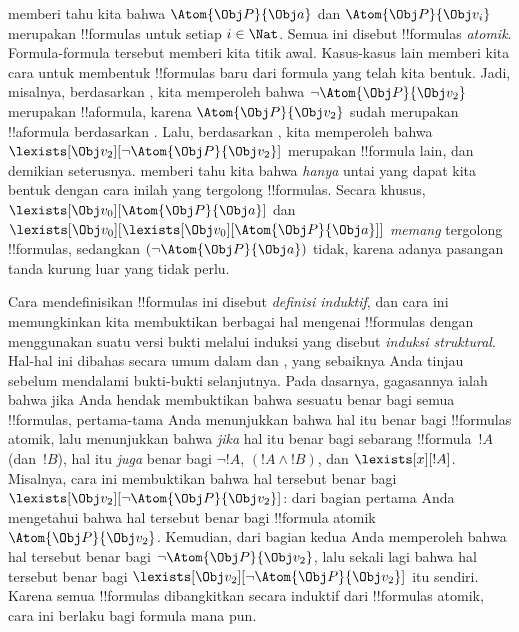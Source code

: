 \documentclass[../../../include/open-logic-section]{subfiles}
\begin{document}
 memberi tahu kita bahwa $\Atom{\Obj P}{\Obj a}$ dan
$\Atom{\Obj P}{\Obj v_i}$ merupakan !!{formula}s untuk setiap $i \in
\Nat$. Semua ini disebut !!{formula}s \emph{atomik}. Formula-formula tersebut
memberi kita titik awal. Kasus-kasus lain memberi kita cara untuk membentuk
!!{formula}s baru dari formula yang telah kita bentuk. Jadi, misalnya,
berdasarkan , kita memperoleh bahwa $\lnot \Atom{\Obj P}{\Obj
v_2}$ merupakan !!a{formula}, karena $\Atom{\Obj P}{\Obj v_2}$ sudah
merupakan !!a{formula} berdasarkan . Lalu, berdasarkan
, kita memperoleh bahwa $\lexists[\Obj v_2][\lnot
\Atom{\Obj P}{\Obj v_2}]$ merupakan !!{formula} lain, dan demikian
seterusnya.  memberi tahu kita bahwa \emph{hanya} untai
yang dapat kita bentuk dengan cara inilah yang tergolong !!{formula}s. Secara
khusus, $\lexists[\Obj v_0][\Atom{\Obj P}{\Obj a}]$ dan $\lexists[\Obj
v_0][\lexists[\Obj v_0][\Atom{\Obj P}{\Obj a}]]$ \emph{memang} tergolong
!!{formula}s, sedangkan $(\lnot \Atom{\Obj P}{\Obj a})$ tidak, karena adanya
pasangan tanda kurung luar yang tidak perlu.

Cara mendefinisikan !!{formula}s ini disebut \emph{definisi induktif}, dan
cara ini memungkinkan kita membuktikan berbagai hal mengenai !!{formula}s
dengan menggunakan suatu versi bukti melalui induksi yang disebut
\emph{induksi struktural}. Hal-hal ini dibahas secara umum dalam
 dan , yang sebaiknya Anda
tinjau sebelum mendalami bukti-bukti selanjutnya. Pada dasarnya, gagasannya
ialah bahwa jika Anda hendak membuktikan bahwa sesuatu benar bagi semua
!!{formula}s, pertama-tama Anda menunjukkan bahwa hal itu benar bagi
!!{formula}s atomik, lalu menunjukkan bahwa \emph{jika} hal itu benar bagi
sebarang !!{formula}~$!A$ (dan~$!B$), hal itu \emph{juga} benar bagi $\lnot
!A$, $(!A \land !B)$, dan $\lexists[x][!A]$. Misalnya, cara ini membuktikan
bahwa hal tersebut benar bagi $\lexists[\Obj v_2][\lnot \Atom{\Obj P}{\Obj
v_2}]$: dari bagian pertama Anda mengetahui bahwa hal tersebut benar bagi
!!{formula} atomik~$\Atom{\Obj P}{\Obj v_2}$. Kemudian, dari bagian kedua
Anda memperoleh bahwa hal tersebut benar bagi $\lnot \Atom{\Obj P}{\Obj
v_2}$, lalu sekali lagi bahwa hal tersebut benar bagi $\lexists[\Obj
v_2][\lnot \Atom{\Obj P}{\Obj v_2}]$ itu sendiri. Karena semua !!{formula}s
dibangkitkan secara induktif dari !!{formula}s atomik, cara ini berlaku bagi
formula mana pun.
\end{document}
